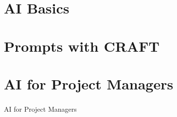 
\section[Core]{AI Basics}



\section[Prompts]{Prompts with CRAFT}


\section[PM]{AI for Project Managers}
\begin{frame}[fragile]\frametitle{}
\begin{center}
{\Large AI for Project Managers}
\end{center}
\end{frame}

